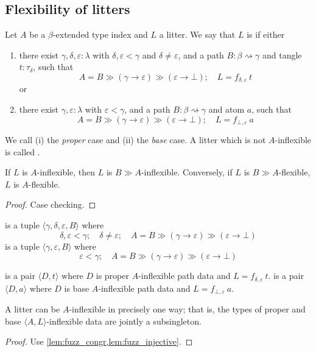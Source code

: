 \subsection{Flexibility of litters}
\begin{definition}
    Let \( A \) be a \( \beta \)-extended type index and \( L \) a litter.
    We say that \( L \) is  if either
    \begin{enumerate}
        \item there exist \( \gamma, \delta, \varepsilon : \lambda \) with \( \delta, \varepsilon < \gamma \) and \( \delta \neq \varepsilon \), and a path \( B : \beta \rightsquigarrow \gamma \) and tangle \( t : \tau_\delta \), such that
        \[ A = B \gg (\gamma \to \varepsilon) \gg (\varepsilon \to \bot);\quad L = f_{\delta,\varepsilon}\ t \]
        or
        \item there exist \( \gamma, \varepsilon : \lambda \) with \( \varepsilon < \gamma \), and a path \( B : \beta \rightsquigarrow \gamma \) and atom \( a \), such that
        \[ A = B \gg (\gamma \to \varepsilon) \gg (\varepsilon \to \bot);\quad L = f_{\bot,\varepsilon}\ a \]
    \end{enumerate}
    We call (i) the \emph{proper} case and (ii) the \emph{base} case.
    A litter which is not \( A \)-inflexible is called .
\end{definition}
\begin{lemma}
    \label{lem:comp_flexible}
    If \( L \) is \( A \)-inflexible, then \( L \) is \( B \gg A \)-inflexible.
    Conversely, if \( L \) is \( B \gg A \)-flexible, \( L \) is \( A \)-flexible.
\end{lemma}
\begin{proof}
    Case checking.
\end{proof}
\begin{definition}
     is a tuple \( \langle \gamma, \delta, \varepsilon, B \rangle \) where
    \[ \delta, \varepsilon < \gamma;\quad \delta \neq \varepsilon; \quad A = B \gg (\gamma \to \varepsilon) \gg (\varepsilon \to \bot) \]
     is a tuple \( \langle \gamma, \varepsilon, B \rangle \) where
    \[ \varepsilon < \gamma; \quad A = B \gg (\gamma \to \varepsilon) \gg (\varepsilon \to \bot) \]
\end{definition}
\begin{definition}
     is a pair \( \langle D, t \rangle \) where \( D \) is proper \( A \)-inflexible path data and \( L = f_{\delta,\varepsilon}\ t \).
     is a pair \( \langle D, a \rangle \) where \( D \) is base \( A \)-inflexible path data and \( L = f_{\bot,\varepsilon}\ a \).
\end{definition}
\begin{lemma}
    A litter can be \( A \)-inflexible in precisely one way; that is, the types of proper and base \( \langle A, L \rangle \)-inflexible data are jointly a subsingleton.
\end{lemma}
\begin{proof}
    Use \cref{lem:fuzz_congr,lem:fuzz_injective}.
\end{proof}
